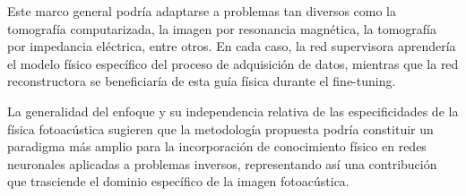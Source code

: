 Este marco general podría adaptarse a problemas tan diversos como la tomografía computarizada, la imagen por resonancia magnética, la tomografía por impedancia eléctrica, entre otros. En cada caso, la red supervisora aprendería el modelo físico específico del proceso de adquisición de datos, mientras que la red reconstructora se beneficiaría de esta guía física durante el fine-tuning.

La generalidad del enfoque y su independencia relativa de las especificidades de la física fotoacústica sugieren que la metodología propuesta podría constituir un paradigma más amplio para la incorporación de conocimiento físico en redes neuronales aplicadas a problemas inversos, representando así una contribución que trasciende el dominio específico de la imagen fotoacústica.